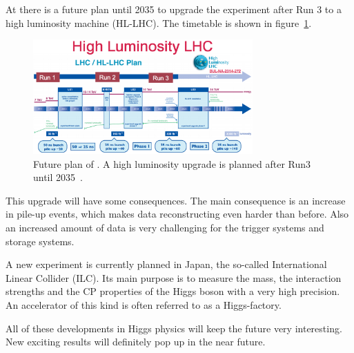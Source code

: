At \LHC there is a future plan until 2035 to upgrade the experiment after Run 3 to a high luminosity machine (HL-LHC). The timetable is shown in figure~\ref{figure_hllhc}.

\begin{figure}[h]
\includegraphics[width=0.75\textwidth]{../plots/hllhc.png}
\caption[HL-LHC]{Future plan of \LHC. A high luminosity upgrade is planned after Run3 until 2035~\cite{HL-LHC}.}
\label{figure_hllhc}
\end{figure}

This upgrade will have some consequences. The main consequence is an increase in pile-up events, which makes data reconstructing even harder than before.
Also an increased amount of data is very challenging for the trigger systems and storage systems.

A new experiment is currently planned in Japan, the so-called International Linear Collider (ILC). Its main purpose is to measure
the mass, the interaction strengths and the CP properties of the Higgs boson with a very high precision. An accelerator of this kind is often referred to as
a Higgs-factory.

All of these developments in Higgs physics will keep the future very interesting. New exciting results will definitely pop up in the near future.
